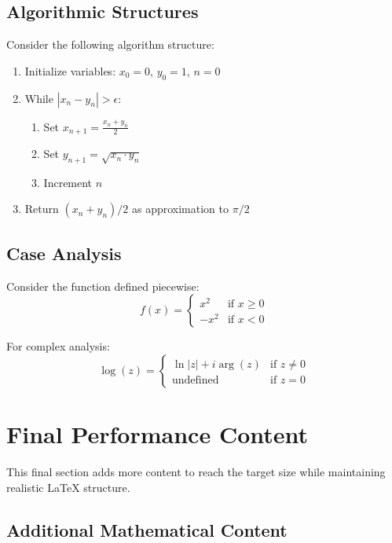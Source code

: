 \documentclass[12pt]{article}
\begin{document}
\subsection{Algorithmic Structures}

Consider the following algorithm structure:
\begin{enumerate}
\item Initialize variables: $x_0 = 0$, $y_0 = 1$, $n = 0$
\item While $|x_n - y_n| > \epsilon$:
\begin{enumerate}
\item Set $x_{n+1} = \frac{x_n + y_n}{2}$
\item Set $y_{n+1} = \sqrt{x_n \cdot y_n}$
\item Increment $n$
\end{enumerate}
\item Return $(x_n + y_n)/2$ as approximation to $\pi/2$
\end{enumerate}

\subsection{Case Analysis}

Consider the function defined piecewise:
\begin{equation}
f(x) = \begin{cases}
x^2 & \text{if } x \geq 0 \\
-x^2 & \text{if } x < 0
\end{cases}
\end{equation}

For complex analysis:
\begin{equation}
\log(z) = \begin{cases}
\ln|z| + i\arg(z) & \text{if } z \neq 0 \\
\text{undefined} & \text{if } z = 0
\end{cases}
\end{equation}

\section{Final Performance Content}

This final section adds more content to reach the target size while maintaining realistic LaTeX structure.

\subsection{Additional Mathematical Content}
\end{document}
